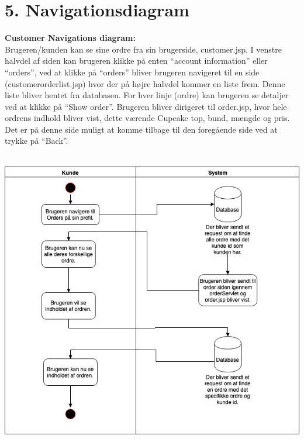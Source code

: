 \documentclass[11pt]{report}
\begin{document}
\chapter*{5. Navigationsdiagram}
\textbf{Customer Navigations diagram:}\\
Brugeren/kunden kan se sine ordre fra sin brugerside, customer.jsp. I
venstre halvdel af siden kan brugeren klikke på enten “account
information” eller “orders”, ved at klikke på “orders” bliver brugeren
navigeret til en side (customerorderlist.jsp) hvor der på højre
halvdel kommer en liste frem. Denne liste bliver hentet fra
databasen. For hver linje (ordre) kan brugeren se detaljer ved at
klikke på “Show order”. Brugeren bliver dirigeret til order.jsp, hvor
hele ordrens indhold bliver vist, dette værende Cupcake top, bund,
mængde og pris. Det er på denne side muligt at komme tilbage til den
foregående side ved at trykke på “Back”. \\\\
\begin{center}
\includegraphics[width=14cm]{OrdersCupCake.png}
\end{center}
\newpage
\end{document}
